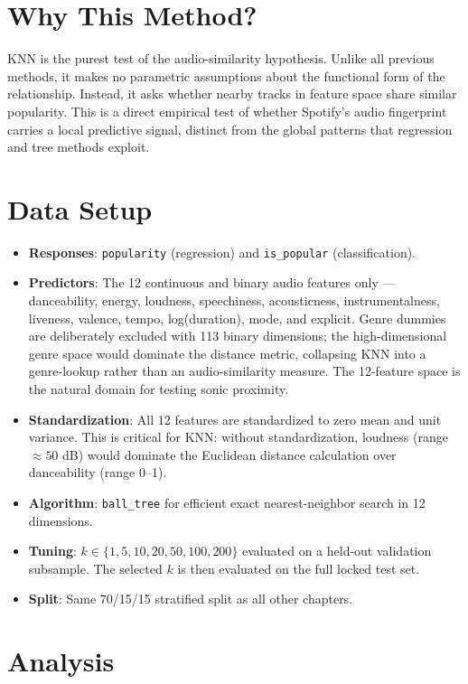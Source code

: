 \documentclass[12pt, oneside]{book}
\begin{document}
\section{Why This Method?}
 
KNN is the purest test of the audio-similarity hypothesis. Unlike all previous methods, it makes no parametric assumptions about the functional form of the relationship. Instead, it asks whether nearby tracks in feature space share similar popularity. This is a direct empirical test of whether Spotify's audio fingerprint carries a local predictive signal, distinct from the global patterns that regression and tree methods exploit.
 
\section{Data Setup}
 
\begin{itemize}
    \item \textbf{Responses}: \texttt{popularity} (regression) and \texttt{is\_popular} (classification).
    \item \textbf{Predictors}: The 12 continuous and binary audio features only --- danceability, energy, loudness, speechiness, acousticness, instrumentalness, liveness, valence, tempo, log(duration), mode, and explicit. Genre dummies are deliberately excluded with 113 binary dimensions; the high-dimensional genre space would dominate the distance metric, collapsing KNN into a genre-lookup rather than an audio-similarity measure. The 12-feature space is the natural domain for testing sonic proximity.
    \item \textbf{Standardization}: All 12 features are standardized to zero mean and unit variance. This is critical for KNN: without standardization, loudness (range $\approx 50$ dB) would dominate the Euclidean distance calculation over danceability (range 0--1).
    \item \textbf{Algorithm}: \texttt{ball\_tree} for efficient exact nearest-neighbor search in 12 dimensions.
    \item \textbf{Tuning}: $k \in \{1, 5, 10, 20, 50, 100, 200\}$ evaluated on a held-out validation subsample. The selected $k$ is then evaluated on the full locked test set.
    \item \textbf{Split}: Same 70/15/15 stratified split as all other chapters.
\end{itemize}
 
\section{Analysis}
 
\end{document}
